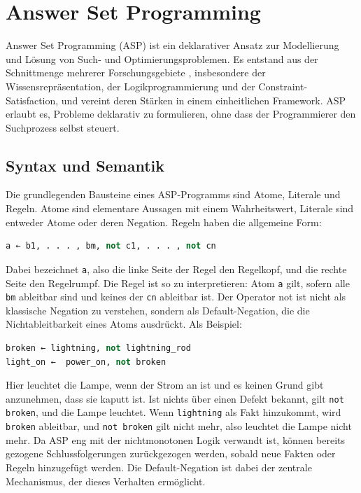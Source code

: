 \section{Answer Set Programming}

Answer Set Programming (ASP) ist ein deklarativer Ansatz  zur Modellierung und Lösung von Such- und Optimierungsproblemen. Es entstand aus der Schnittmenge mehrerer Forschungsgebiete , insbesondere der Wissensrepräsentation, der Logikprogrammierung und der Constraint-Satisfaction, und vereint deren Stärken in einem einheitlichen Framework. ASP erlaubt es, Probleme deklarativ zu formulieren, ohne dass der Programmierer den Suchprozess selbst steuert.
\subsection{Syntax und Semantik}
Die grundlegenden Bausteine eines ASP-Programms sind Atome, Literale und Regeln. Atome sind elementare Aussagen mit einem Wahrheitswert, Literale sind entweder Atome oder deren Negation. Regeln haben die allgemeine Form:
\begin{lstlisting}[language=python]
a ← b1, . . . , bm, not c1, . . . , not cn
\end{lstlisting}

Dabei bezeichnet \texttt{a}, also die linke Seite der Regel den Regelkopf, und die rechte Seite den Regelrumpf. Die Regel ist so zu interpretieren: Atom \texttt{a} gilt, sofern alle \texttt{bm} ableitbar sind und keines der \texttt{cn} ableitbar ist. 
Der Operator not ist nicht als klassische Negation zu verstehen, sondern als Default-Negation, die die Nichtableitbarkeit eines Atoms ausdrückt. 
Als Beispiel:
\begin{lstlisting}[language=python]
broken ← lightning, not lightning_rod
light_on ←  power_on, not broken 
\end{lstlisting}
Hier leuchtet die Lampe, wenn der Strom an ist und es keinen Grund gibt anzunehmen, dass sie kaputt ist. Ist nichts über einen Defekt bekannt, gilt \texttt{not broken}, und die Lampe leuchtet.
Wenn \texttt{lightning} als Fakt hinzukommt, wird \texttt{broken} ableitbar, und \texttt{not broken} gilt nicht mehr, also leuchtet die Lampe nicht mehr.
Da ASP eng mit der nichtmonotonen Logik verwandt ist, können bereits gezogene Schlussfolgerungen zurückgezogen werden, sobald neue Fakten oder Regeln hinzugefügt werden. Die Default-Negation ist dabei der zentrale Mechanismus, der dieses Verhalten ermöglicht.
